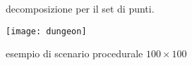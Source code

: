 \begin{figure}[!htb]
  \centering
  \resizebox{0.7\linewidth}{!}{}
  \caption{decomposizione per il set di punti.}
  \label{fig:decomposizione}
\end{figure}

\begin{figure}[!htb]
	\centering
	\texttt{[image: dungeon]}
	\caption{esempio di scenario procedurale $100\times100$}
 	\label{fig:dungeon}
\end{figure}
